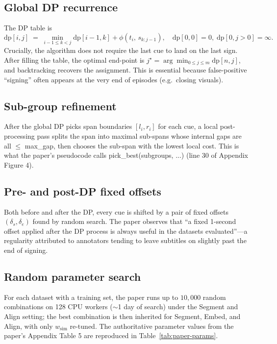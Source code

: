 \documentclass[11pt,a4paper]{article}
\def\texttt#1{#1}%
\def\emph#1{#1}%
\begin{document}
\subsection{Global DP recurrence}
The DP table is
\[
\mathrm{dp}[i,j] \;=\;
\min_{i-1 \le k < j} \mathrm{dp}[i-1, k] + \phi(t_i,\,s_{k:j-1}),
\quad \mathrm{dp}[0,0]=0,\; \mathrm{dp}[0,j>0]=\infty.
\]
Crucially, the algorithm does \emph{not} require the last cue to land on the
last sign. After filling the table, the optimal end-point is
$j^\star = \arg\min_{0\le j \le m} \mathrm{dp}[n, j]$, and backtracking
recovers the assignment. This is essential because false-positive ``signing''
often appears at the very end of episodes (e.g.\ closing visuals).

\subsection{Sub-group refinement}
After the global DP picks span boundaries $[l_i, r_i]$ for each cue, a local
post-processing pass splits the span into maximal sub-spans whose internal
gaps are all $\le$ \texttt{max\_gap}, then chooses the sub-span with the
lowest local cost. This is what the paper's pseudocode calls
\texttt{pick\_best(subgroups, ...)} (line 30 of Appendix Figure 4).

\subsection{Pre- and post-DP fixed offsets}
Both before \emph{and} after the DP, every cue is shifted by a pair of fixed
offsets $(\delta_s, \delta_e)$ found by random search. The paper observes
that ``a fixed 1-second offset applied after the DP process is always useful
in the datasets evaluated''---a regularity attributed to annotators tending
to leave subtitles on slightly past the end of signing.

\subsection{Random parameter search}
For each dataset with a training set, the paper runs up to $10{,}000$ random
combinations on 128 CPU workers ($\sim$1 day of search) under the
\emph{Segment and Align} setting; the best combination is then inherited for
\emph{Segment, Embed, and Align}, with only $w_{\mathrm{sim}}$ re-tuned. The
authoritative parameter values from the paper's Appendix Table 5 are
reproduced in Table~\ref{tab:paper-params}.
\end{document}

